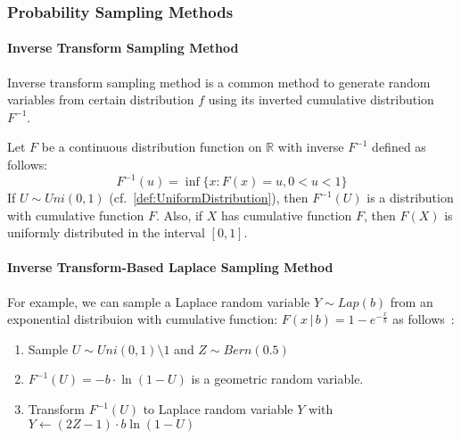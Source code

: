 \subsubsection{Probability Sampling Methods}
\label{subsec:ProbabilitySamplingMethods}

\paragraph{Inverse Transform Sampling Method}
Inverse transform sampling method is a common method to generate random variables from certain distribution $f$ using its inverted cumulative distribution $F^{-1}$.
\begin{theorem}
    \label{theorem:inversionSamplingMethod}
    Let $F$ be a continuous distribution function on $\mathbb{R}$ with inverse $F^{-1}$ defined as follows:
    \begin{equation}
        F^{-1}\left( u\right) =\inf \{ x:F\left( x\right) =u,0 <u < 1\}
    \end{equation}
    If $U\sim Uni\left( 0,1\right)$ (cf.~\autoref{def:UniformDistribution}), then $F^{-1}\left( U\right)$ is a distribution with cumulative function $F$. Also, if $X$ has cumulative function $F$, then $F\left( X\right) $ is uniformly distributed in the interval $\left[0,1\right]  $.
\end{theorem}



\paragraph{Inverse Transform-Based Laplace Sampling Method}
\label{algo:InverseTransform-BasedLaplaceSamplingMethod}
For example, we can sample a Laplace random variable $Y\sim Lap\left(b\right) $ from an exponential distribuion with cumulative function: $F\left(x\,|\, b\right) =1-e^{-\frac{x}{b}}$ as follows~\cite[Chapter 3.4]{knuth2014art}:
\begin{enumerate}
    \item Sample $U\sim Uni\left(0,1\right)\setminus 1 $ and $Z \sim Bern\left(0.5\right) $
    \item $  F^{-1}\left(U\right) =-b \cdot \ln\left(1-U\right)  $ is a geometric random variable.
    \item  Transform $F^{-1}\left(U\right)$ to Laplace random variable $Y$ with $Y\gets \left(2Z-1\right)\cdot b \ln\left(1-U\right) $
\end{enumerate}

